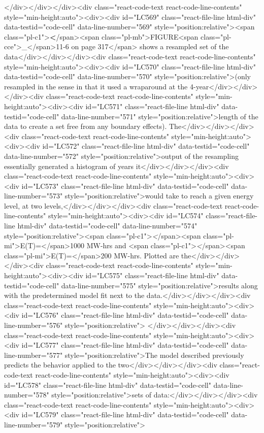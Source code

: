 {{{{</div></div></div><div class="react-code-text react-code-line-contents" style="min-height:auto"><div><div id="LC569" class="react-file-line html-div" data-testid="code-cell" data-line-number="569" style="position:relative"><span class="pl-c1">\textbf</span>{<span class="pl-mb">FIGURE<span class="pl-cce">\_</span>11-6 on page 317</span>} shows a resampled set of the data</div></div></div><div class="react-code-text react-code-line-contents" style="min-height:auto"><div><div id="LC570" class="react-file-line html-div" data-testid="code-cell" data-line-number="570" style="position:relative">(only resampled in the sense in that it used a wraparound at the 4-year</div></div></div><div class="react-code-text react-code-line-contents" style="min-height:auto"><div><div id="LC571" class="react-file-line html-div" data-testid="code-cell" data-line-number="571" style="position:relative">length of the data to create a set free from any boundary effects). The</div></div></div><div class="react-code-text react-code-line-contents" style="min-height:auto"><div><div id="LC572" class="react-file-line html-div" data-testid="code-cell" data-line-number="572" style="position:relative">output of the resampling essentially generated a histogram of years it</div></div></div><div class="react-code-text react-code-line-contents" style="min-height:auto"><div><div id="LC573" class="react-file-line html-div" data-testid="code-cell" data-line-number="573" style="position:relative">would take to reach a given energy level, at two levels,</div></div></div><div class="react-code-text react-code-line-contents" style="min-height:auto"><div><div id="LC574" class="react-file-line html-div" data-testid="code-cell" data-line-number="574" style="position:relative"><span class="pl-c1">\emph</span>{<span class="pl-mi">E(T)=</span>}1000 MW-hrs and <span class="pl-c1">\emph</span>{<span class="pl-mi">E(T)=</span>}200 MW-hrs. Plotted are the</div></div></div><div class="react-code-text react-code-line-contents" style="min-height:auto"><div><div id="LC575" class="react-file-line html-div" data-testid="code-cell" data-line-number="575" style="position:relative">results along with the predetermined model fit next to the data.</div></div></div><div class="react-code-text react-code-line-contents" style="min-height:auto"><div><div id="LC576" class="react-file-line html-div" data-testid="code-cell" data-line-number="576" style="position:relative">
</div></div></div><div class="react-code-text react-code-line-contents" style="min-height:auto"><div><div id="LC577" class="react-file-line html-div" data-testid="code-cell" data-line-number="577" style="position:relative">The model described previously predicts the behavior applied to the two</div></div></div><div class="react-code-text react-code-line-contents" style="min-height:auto"><div><div id="LC578" class="react-file-line html-div" data-testid="code-cell" data-line-number="578" style="position:relative">sets of data:</div></div></div><div class="react-code-text react-code-line-contents" style="min-height:auto"><div><div id="LC579" class="react-file-line html-div" data-testid="code-cell" data-line-number="579" style="position:relative">
}}}}

